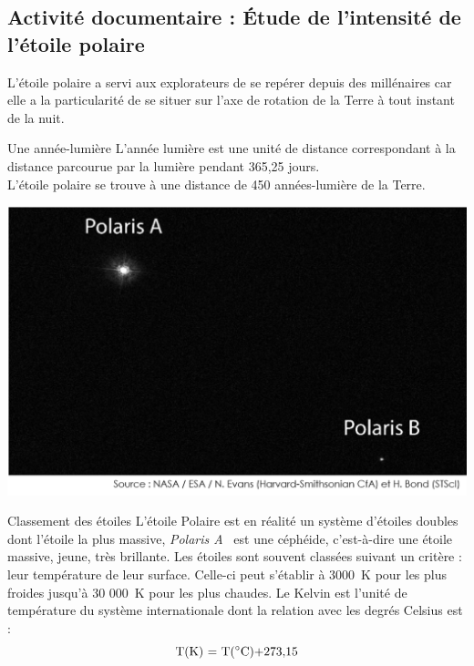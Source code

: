 \subsection{Activité documentaire : \'{E}tude de l'intensité de l'étoile polaire}
L'étoile polaire a servi aux explorateurs de se repérer depuis des millénaires car elle a la particularité de se situer sur l'axe de rotation de la Terre à tout instant de la nuit.\\
\begin{minipage}{0.45\textwidth}
    \begin{doc}{Une année-lumière}
    L'année lumière est une unité de distance correspondant à la distance parcourue par la lumière pendant 365,25 jours.\\
    L'étoile polaire se trouve à une distance de 450 années-lumière de la Terre. 
    \end{doc}
    \begin{center}
        \includegraphics[scale=0.43]{Images/Etoile_polaire.png}
    \end{center}
\end{minipage}
\begin{minipage}{0.54\textwidth}
    \begin{doc}{Classement des étoiles}
     L'étoile Polaire est en réalité un système d'étoiles doubles dont l'étoile la plus massive, \og \textit{Polaris A} \fg~est une céphéide, c’est-à-dire une étoile massive, jeune, très brillante. Les étoiles sont souvent classées suivant un critère : leur température de leur surface. Celle-ci peut s'établir à 3000~K pour les plus froides jusqu'à 30 000~K pour les plus chaudes. Le Kelvin est l'unité de température du système internationale dont la relation avec les degrés Celsius est :
    \begin{equation*}
        \text{T(K) = T($^\circ\!\, \mathrm{C}$)+273,15}
    \end{equation*}
    \vspace{1cm}
    \end{doc}
\end{minipage}
 

